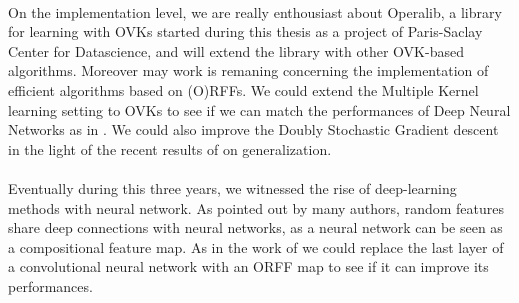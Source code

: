 \paragraph{}
On the implementation level, we are really enthousiast about Operalib, a
library for learning with \aclp{OVK} started during this thesis as a project of
Paris-Saclay Center for Datascience, and will extend the library with other
\acs{OVK}-based algorithms. Moreover may work is remaning concerning the
implementation of efficient algorithms based on (O)\acsp{RFF}. We could extend
the Multiple Kernel learning setting to \acsp{OVK} to see if we can match the
performances of Deep Neural Networks as in \citet{lu2014scale}.
We could also improve the Doubly Stochastic Gradient descent in the light of
the recent results of \citet{rudi2016generalization} on generalization.
\paragraph{}
Eventually during this three years, we witnessed the rise of deep-learning
methods with neural network. As pointed out by many authors, random features
share deep connections with neural networks, as a neural network can be seen as
a compositional feature map. As in the work of \citet{yang2015deep} we could
replace the last layer of a convolutional neural network
\citep{lecun1995convolutional} with an \acs{ORFF} map to see if it can improve
its performances.

\chapterend
